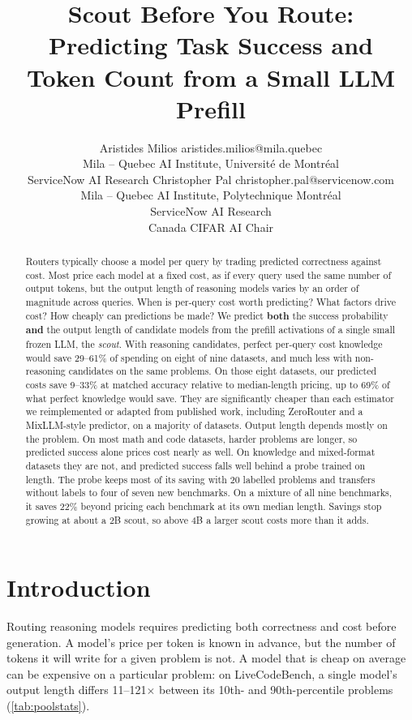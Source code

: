 \documentclass[10pt]{article}
\title{Scout Before You Route: Predicting Task Success and \\ Token Count from a Small LLM Prefill}
\author{\name Aristides Milios \email aristides.milios@mila.quebec \\
\addr Mila -- Quebec AI Institute, Universit\'e de Montr\'eal \\
\addr ServiceNow AI Research
\AND
\name Christopher Pal \email christopher.pal@servicenow.com \\
\addr Mila -- Quebec AI Institute, Polytechnique Montr\'eal \\
\addr ServiceNow AI Research \\
\addr Canada CIFAR AI Chair}
\begin{document}
\maketitle
\ifdefined\anonymous
{\renewcommand{\thefootnote}{}}
\else\lhead{}\fi
\begin{abstract}
    Routers typically choose a model per query by trading predicted correctness against cost. Most price each model at a fixed cost, as if every query used the same number of output tokens, but the output length of reasoning models varies by an order of magnitude across queries. When is per-query cost worth predicting? What factors drive cost? How cheaply can predictions be made? We predict \textbf{both} the success probability \textbf{and} the output length of candidate models from the prefill activations of a single small frozen LLM, the \emph{scout}. With reasoning candidates, perfect per-query cost knowledge would save 29--61\% of spending on eight of nine datasets, and much less with non-reasoning candidates on the same problems. On those eight datasets, our predicted costs save 9--33\% at matched accuracy relative to median-length pricing, up to 69\% of what perfect knowledge would save. They are significantly cheaper than each estimator we reimplemented or adapted from published work, including ZeroRouter and a MixLLM-style predictor, on a majority of datasets. Output length depends mostly on the problem. On most math and code datasets, harder problems are longer, so predicted success alone prices cost nearly as well. On knowledge and mixed-format datasets they are not, and predicted success falls well behind a probe trained on length. The probe keeps most of its saving with 20 labelled problems and transfers without labels to four of seven new benchmarks. On a mixture of all nine benchmarks, it saves 22\% beyond pricing each benchmark at its own median length. Savings stop growing at about a 2B scout, so above 4B a larger scout costs more than it adds.
\end{abstract}

\section{Introduction}
Routing reasoning models requires predicting both correctness and cost before generation. A model's price per token is known in advance, but the number of tokens it will write for a given problem is not. A model that is cheap on average can be expensive on a particular problem: on LiveCodeBench, a single model's output length differs 11--121$\times$ between its 10th- and 90th-percentile problems (\cref{tab:poolstats}).
\end{document}
